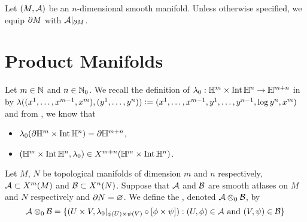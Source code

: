 \documentclass{book}
\begin{document}
\begin{note} 
	Let $(M, \mathcal{A})$ be an $n$-dimensional smooth manifold. Unless otherwise specified, we equip $\partial M$ with $\mathcal{A}|_{\partial M}$.
\end{note}


































\newpage
\section{Product Manifolds}

\begin{note} 
	Let $m \in \mathbb{N}$ and $n \in \mathbb{N}_0$. We recall the definition of $\lambda_0: \mathbb{H}^m \times \operatorname{Int} \mathbb{H}^n \rightarrow \mathbb{H}^{m+n}$ in  by $\lambda((x^1, \ldots, x^{m-1}, x^m), (y^1, \ldots, y^n)) \vcentcolon= (x^1, \ldots, x^{m-1}, y^1, \ldots, y^{n-1}, \log y^n, x^m)$ and from , we know that
	\begin{itemize}
		\item $\lambda_0(\partial \mathbb{H}^m \times \operatorname{Int} \mathbb{H}^n) = \partial \mathbb{H}^{m+n}$,
		\item $(\mathbb{H}^m \times \operatorname{Int} \mathbb{H}^n, \lambda_0) \in X^{m+n}(\mathbb{H}^m \times \operatorname{Int} \mathbb{H}^n)$.
	\end{itemize}
\end{note}

\begin{defn} 
	Let $M$, $N$ be topological manifolds of dimension $m$ and $n$ respectively, $\mathcal{A} \subset X^m(M)$ and $\mathcal{B} \subset X^n(N)$. Suppose that $\mathcal{A}$ and $\mathcal{B}$ are smooth atlases on $M$ and $N$ respectively and $\partial N = \varnothing$. We define the , denoted $\mathcal{A} \otimes_0 \mathcal{B}$, by 
	$$\mathcal{A} \otimes_0 \mathcal{B} = \{(U \times V, \lambda_0|_{\phi(U) \times \psi(V)} \circ [\phi \times \psi]): (U, \phi) \in \mathcal{A} \text{ and } (V, \psi) \in \mathcal{B}\}$$ 
\end{defn}
\end{document}
